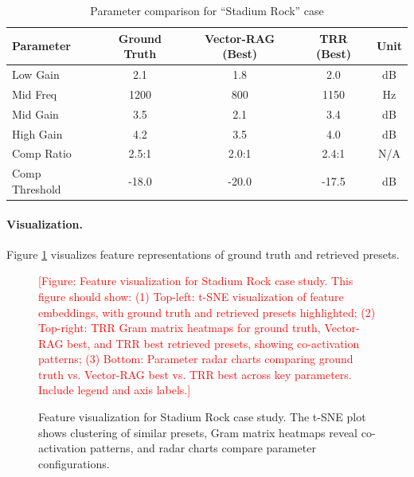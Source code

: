 \begin{table}[h]
	\centering
	\caption{Parameter comparison for ``Stadium Rock'' case}
	\label{tab:stadium_rock_params}
	\small
	\begin{tabular}{lcccc}
		\toprule
		\textbf{Parameter} & \textbf{Ground Truth} & \textbf{Vector-RAG (Best)} & \textbf{TRR (Best)} & \textbf{Unit} \\
		\midrule
		Low Gain           & 2.1                   & 1.8                        & 2.0                 & dB            \\
		Mid Freq           & 1200                  & 800                        & 1150                & Hz            \\
		Mid Gain           & 3.5                   & 2.1                        & 3.4                 & dB            \\
		High Gain          & 4.2                   & 3.5                        & 4.0                 & dB            \\
		Comp Ratio         & 2.5:1                 & 2.0:1                      & 2.4:1               & N/A           \\
		Comp Threshold     & -18.0                 & -20.0                      & -17.5               & dB            \\
		\bottomrule
	\end{tabular}
\end{table}

\paragraph{Visualization.} Figure \ref{fig:stadium_rock_features} visualizes feature representations of ground truth and retrieved presets.

\begin{figure}[h]
	\centering
	\textcolor{red}{[Figure: Feature visualization for Stadium Rock case study. This figure should show: (1) Top-left: t-SNE visualization of feature embeddings, with ground truth and retrieved presets highlighted; (2) Top-right: TRR Gram matrix heatmaps for ground truth, Vector-RAG best, and TRR best retrieved presets, showing co-activation patterns; (3) Bottom: Parameter radar charts comparing ground truth vs. Vector-RAG best vs. TRR best across key parameters. Include legend and axis labels.]}
	\caption{Feature visualization for Stadium Rock case study. The t-SNE plot shows clustering of similar presets, Gram matrix heatmaps reveal co-activation patterns, and radar charts compare parameter configurations.}
	\label{fig:stadium_rock_features}
\end{figure}


